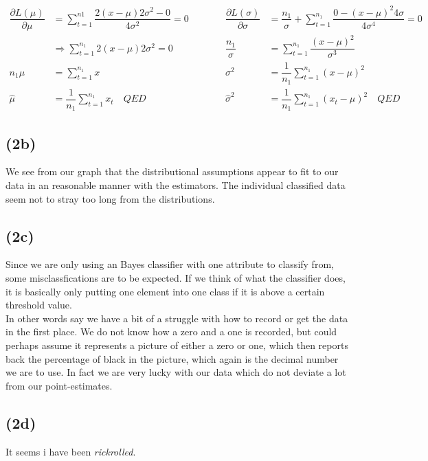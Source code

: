 \documentclass[12pt, letterpaper]{article}
\begin{document}
      \begin{align*}
        \dfrac{\partial L(\mu)}{\partial \mu} & =\sum_{t=1}^{n1}\dfrac{2(x - \mu)2\sigma^2 - 0}{4\sigma^2} = 0 \quad&\quad\quad \dfrac{\partial L(\sigma)}{\partial\sigma} & = \dfrac{n_1}{\sigma} + \sum_{t=1}^{n_1} \dfrac{0 - (x - \mu)^2 4\sigma}{4\sigma^4}  = 0
        \\
        & \Rightarrow \sum_{t=1}^{n_1} 2(x - \mu)2\sigma^2 = 0 \quad&\quad\quad
        \dfrac{n_1}{\sigma} & = \sum_{t=1}^{n_1} \dfrac{(x-\mu)^2}{\sigma^3}
        \\
        n_1\mu & = \sum_{t=1}^{n_1} x \quad&\quad\quad \sigma^2 &= \dfrac{1}{n_1}\sum_{t=1}^{n_1} (x-\mu)^2
        \\
        \hat{\mu} & = \dfrac{1}{n_1}\sum_{t=1}^{n_1} x_t \quad QED &\quad\quad
        \hat{\sigma}^2 &= \dfrac{1}{n_1}\sum_{t=1}^{n_1} (x_t-\mu)^2 \quad QED
      \end{align*}
    \subsection*{(2b)}
      We see from our graph that the distributional assumptions appear to fit to our data in an reasonable manner with the estimators. The individual classified data seem not to stray too long from the distributions.
    \subsection*{(2c)}
      Since we are only using an Bayes classifier with one attribute to classify from, some misclassfications are to be expected. If we think of what the classifier does, it is basically only putting one element into one class if it is above a certain threshold value.\\
      In other words say we have a bit of a struggle with how to record or get the data in the first place. We do not know how a zero and a one is recorded, but could perhaps assume it represents a picture of either a zero or one, which then reports back the percentage of black in the picture, which again is the decimal number we are to use. In fact we are very lucky with our data which do not deviate a lot from our point-estimates.
    \subsection*{(2d)}
      It seems i have been \textit{rickrolled}. ~\cite{Karl:mannen}


\end{document}

